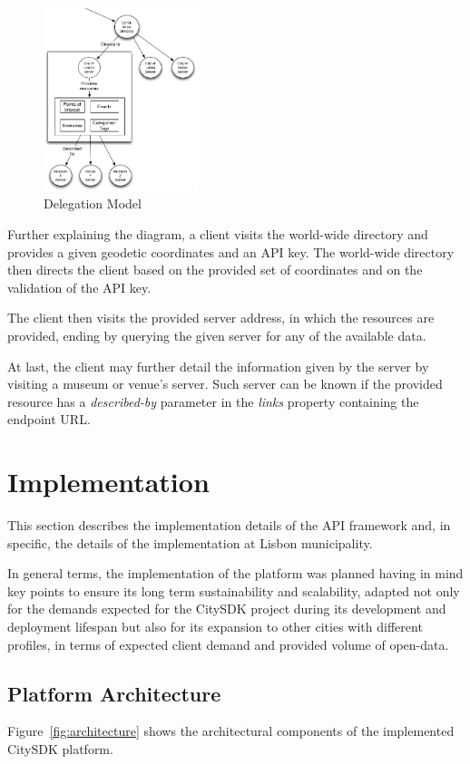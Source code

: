 \documentclass[times,doublespace]{ettauth}%
\begin{document}
\begin{figure}
\centering
\includegraphics[width=0.4\textwidth]{images/delegation}
\caption{Delegation Model}
\label{fig:delegation}
\end{figure}

Further explaining the diagram, a client visits the world-wide directory and provides a given geodetic coordinates and an API key. The world-wide directory then directs the client based on the provided set of coordinates and on the validation of the API key.

The client then visits the provided server address, in which the resources are provided, ending by querying the given server for any of the available data. 

At last, the client may further detail the information given by the server by visiting a museum or venue's server. Such server can be known if the provided resource has a \textit{described-by} parameter in the \textit{links} property containing the endpoint URL.

\section{Implementation}
\label{s:implementation}
This section describes the implementation details of the API framework and, in specific, the details of the implementation at Lisbon municipality. 

In general terms, the implementation of the platform was planned having in mind key points to ensure its long term sustainability and scalability, adapted not only for the demands expected for the CitySDK project during its development and deployment lifespan but also for its expansion to other cities with different profiles, in terms of expected client demand and provided volume of open-data.

\subsection{Platform Architecture}
Figure~\ref{fig:architecture} shows the architectural components of the implemented CitySDK platform.
\end{document}
